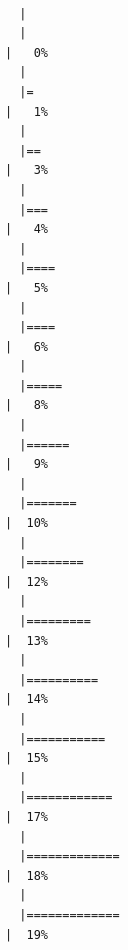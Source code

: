 \documentclass[
  letterpaper,
  DIV=11,
  numbers=noendperiod]{scrartcl}
\begin{document}
\begin{verbatim}

  |                                                                            
  |                                                                      |   0%
  |                                                                            
  |=                                                                     |   1%
  |                                                                            
  |==                                                                    |   3%
  |                                                                            
  |===                                                                   |   4%
  |                                                                            
  |====                                                                  |   5%
  |                                                                            
  |====                                                                  |   6%
  |                                                                            
  |=====                                                                 |   8%
  |                                                                            
  |======                                                                |   9%
  |                                                                            
  |=======                                                               |  10%
  |                                                                            
  |========                                                              |  12%
  |                                                                            
  |=========                                                             |  13%
  |                                                                            
  |==========                                                            |  14%
  |                                                                            
  |===========                                                           |  15%
  |                                                                            
  |============                                                          |  17%
  |                                                                            
  |=============                                                         |  18%
  |                                                                            
  |=============                                                         |  19%

\end{verbatim}
\end{document}
